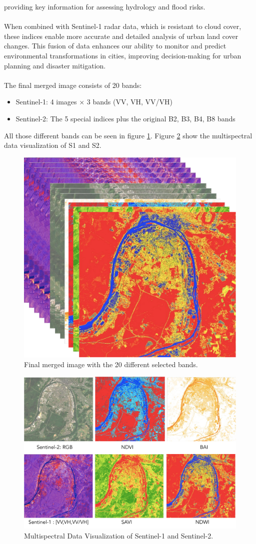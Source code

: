\documentclass[usenatbib]{tjaa}
\begin{document}
providing key information for assessing hydrology and ﬂood risks.\\
\\
\noindent
When combined with Sentinel-1 radar data, which is resistant to cloud cover, these indices
enable more accurate and detailed analysis of urban land cover changes. This fusion of data
enhances our ability to monitor and predict environmental transformations in cities, improving
decision-making for urban planning and disaster mitigation.
\\
\\
\noindent
The ﬁnal merged image consists of 20 bands:
\begin{itemize}
  \item Sentinel-1: 4 images × 3 bands (VV, VH, VV/VH)
  \item Sentinel-2: The 5 special indices plus the original B2, B3, B4, B8 bands 
\end{itemize}
All those different bands can be seen in figure \ref{20-bands}. Figure \ref{S1-S2-bands}
show the multispectral data visualization of S1 and S2. 
\begin{figure}
  \centering
  \includegraphics[width=.6\linewidth]{./figures/merged_images_sec2.pdf}
  \caption{Final merged image with the 20 different selected bands.}
  \label{20-bands}
\end{figure}
\begin{figure}
  \centering
  \includegraphics[width=.9\linewidth]{./figures/Image_index.pdf}
  \caption{Multispectral Data Visualization of Sentinel-1 and Sentinel-2.}
  \label{S1-S2-bands}
\end{figure}
\end{document}
